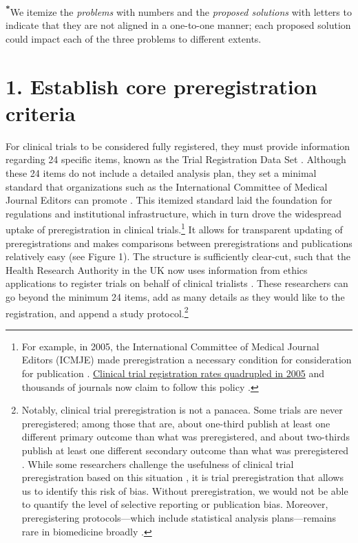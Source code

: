 \documentclass[authordate, meta]{jote-new-article}
\begin{document}
\begin{table}
\begin{fullwidth}
{    \textsuperscript{\textbf{*}}We itemize the \emph{problems} with numbers and the \emph{proposed solutions} with letters to indicate that they are not aligned in a one-to-one manner; each proposed solution could impact each of the three problems to different extents.}

    \label{tab:table1}
  \end{fullwidth}
\end{table}


\section{1. Establish core preregistration criteria}


For clinical trials to be considered fully registered, they must provide information regarding 24 specific items, known as the Trial Registration Data Set \parencites{Organization2017}. Although these 24 items do not include a detailed analysis plan, they set a minimal standard that organizations such as the International Committee of Medical Journal Editors can promote \parencites{ICMJE2022}{ICMJE2023}. This itemized standard laid the foundation for regulations and institutional infrastructure, which in turn drove the widespread uptake of preregistration in clinical trials.\footnote{ For example, in 2005, the International Committee of Medical Journal Editors (ICMJE) made preregistration a necessary condition for consideration for publication \parencites{DeAngelis2004}. \href{http://web.archive.org/save/https://clinicaltrials.gov/ct2/resources/trends}{Clinical trial registration rates quadrupled in 2005} and thousands of journals now claim to follow this policy \parencites{ICMJE2023}.} It allows for transparent updating of preregistrations and makes comparisons between preregistrations and publications relatively easy (see Figure 1). The structure is sufficiently clear-cut, such that the Health Research Authority in the UK now uses information from ethics applications to register trials on behalf of clinical trialists \parencites{Authority2021}. These researchers can go beyond the minimum 24 items, add as many details as they would like to the registration, and append a study protocol.\footnote{ Notably, clinical trial preregistration is not a panacea. Some trials are never preregistered; among those that are, about one-third publish at least one different primary outcome than what was preregistered, and about two-thirds publish at least one different secondary outcome than what was preregistered \parencites{TARG2021}. While some researchers challenge the usefulness of clinical trial preregistration based on this situation \parencites[e.g.,][]{Lash2022}{Abrams2020}, it is trial preregistration that allows us to identify this risk of bias. Without preregistration, we would not be able to quantify the level of selective reporting or publication bias. Moreover, preregistering protocols—which include statistical analysis plans—remains rare in biomedicine broadly \parencites{Serghiou2021}.}
\end{document}
